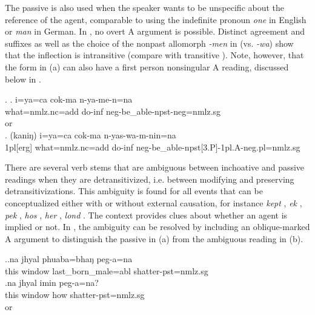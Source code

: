The passive is also used when the speaker wants to be unspecific about the reference of the agent, comparable to using the indefinite pronoun \emph{one} in English or \emph{man} in German. In  \Next[a], no overt A argument is possible. Distinct agreement and  suffixes as well as the choice of the nonpast allomorph \emph{-men} in \Next[a] (vs.  \emph{-wa}) show that the inflection is intransitive (compare with transitive \Next[b]). Note, however, that the form in (a) can also have a first person nonsingular A reading, discussed below in .

\ex. \ag. i=ya=ca cok-ma n-ya-me-n=na\\
what{\sc =nmlz.nc=add} do{\sc -inf} {\sc neg-}be\_able{\sc [3sg]-npst-neg=nmlz.sg}\\
 or\\
\bg. (kaniŋ) i=ya=ca cok-ma n-yas-wa-m-nin=na \\
{\sc 1pl[erg]} what{\sc =nmlz.nc=add} do{\sc -inf} {\sc neg-}be\_able{\sc -npst[3.P]-1pl.A-neg.pl=nmlz.sg}\\ 


There are several verb stems that are ambiguous between inchoative and passive readings when they are detransitivized, i.e. between  modifying and  preserving detransitivizations. This ambiguity is found for all events that can be conceptualized either with or without external causation, for instance \emph{kept} , \emph{ek} ,  \emph{pek} , \emph{hos} , \emph{her} , \emph{lond} . The context provides clues about whether an agent is implied or not. In \Next, the ambiguity can be resolved by including an oblique-marked A argument to distinguish the passive in (a) from the ambiguous reading in (b). 

\ex.\ag.na jhyal phuaba=bhaŋ peg-a=na\\
this window  last\_born\_male{\sc =abl}  shatter{\sc [3sg]-pst=nmlz.sg}\\
\bg.na jhyal imin peg-a=na?\\
this window how shatter{\sc [3sg]-pst=nmlz.sg}\\
 or \\

